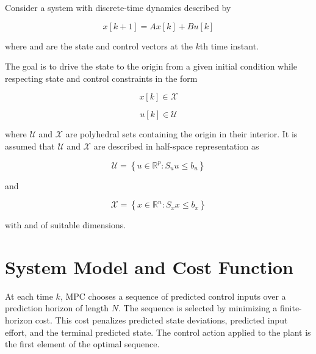 Consider a system with discrete-time dynamics described by

    \begin{equation}
        x[k + 1] = A x[k] + B u[k]
        \label{eq:cap3:dynamic-equation}
    \end{equation}

\noindent
where  and  are 
the state and control vectors at the $k$th time instant.

The goal is to drive the state  to the origin from a given initial condition while respecting
state and control constraints in the form

\begin{equation}
    \label{eq:cap3:state-constraint-set}
    x[k] \in \mathcal{X}
\end{equation}
    
\begin{equation}
    \label{eq:cap3:input-constraint-set}
    u[k] \in \mathcal{U}
\end{equation}

\noindent
where $\mathcal{U}$ and $\mathcal{X}$ are polyhedral sets containing the origin in their interior.
It is assumed that $\mathcal{U}$ and $\mathcal{X}$ are described in half-space representation as


\begin{equation}
    \mathcal{U} = \left\{
        u \in \mathbb{R}^p : S_u u \leq b_u	
    \right\}
\end{equation}

\noindent
and

\begin{equation}
    \label{eq:cap3:polyhedral-state-constraint}
    \mathcal{X} = \left\{
        x \in \mathbb{R}^n : S_x x \leq b_x
    \right\}
\end{equation}

\noindent
with  and  of suitable dimensions.

\section{System Model and Cost Function}


At each time $k$, MPC chooses a sequence of predicted control inputs over a prediction horizon of length $N$. The sequence is selected by minimizing a finite-horizon cost. This cost penalizes predicted state deviations, predicted input effort, and the terminal predicted state. The control action applied to the plant is the first element of the optimal sequence.


